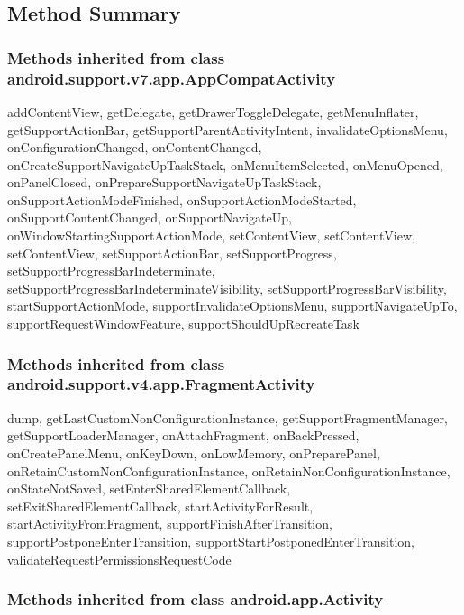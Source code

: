 \subsection{Method Summary}

\subsubsection{Methods inherited from class android.support.v7.app.AppCompatActivity}

addContentView, getDelegate, getDrawerToggleDelegate, getMenuInflater, getSupportActionBar, getSupportParentActivityIntent, invalidateOptionsMenu, onConfigurationChanged, onContentChanged, onCreateSupportNavigateUpTaskStack, onMenuItemSelected, onMenuOpened, onPanelClosed, onPrepareSupportNavigateUpTaskStack, onSupportActionModeFinished, onSupportActionModeStarted, onSupportContentChanged, onSupportNavigateUp, onWindowStartingSupportActionMode, setContentView, setContentView, setContentView, setSupportActionBar, setSupportProgress, setSupportProgressBarIndeterminate, setSupportProgressBarIndeterminateVisibility, setSupportProgressBarVisibility, startSupportActionMode, supportInvalidateOptionsMenu, supportNavigateUpTo, supportRequestWindowFeature, supportShouldUpRecreateTask\\

\subsubsection{Methods inherited from class android.support.v4.app.FragmentActivity}

dump, getLastCustomNonConfigurationInstance, getSupportFragmentManager, getSupportLoaderManager, onAttachFragment, onBackPressed, onCreatePanelMenu, onKeyDown, onLowMemory, onPreparePanel, onRetainCustomNonConfigurationInstance, onRetainNonConfigurationInstance, onStateNotSaved, setEnterSharedElementCallback, setExitSharedElementCallback, startActivityForResult, startActivityFromFragment, supportFinishAfterTransition, supportPostponeEnterTransition, supportStartPostponedEnterTransition, validateRequestPermissionsRequestCode\\

\subsubsection{Methods inherited from class android.app.Activity}

